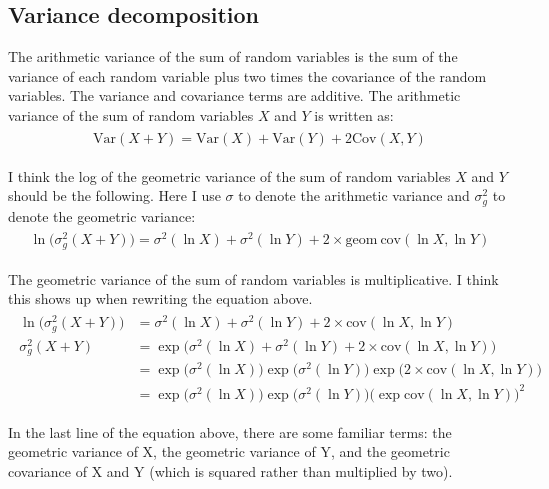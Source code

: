 \documentclass[12pt, oneside, titlepage]{article}   	%
\begin{document}
\subsection*{Variance decomposition}

The arithmetic variance of the sum of random variables is the sum of the variance of each random variable plus two times the covariance of the random variables. The variance and covariance terms are additive. The arithmetic variance of the sum of random variables $X$ and $Y$ is written as:
%
\begin{align}
  \begin{split}
\mathrm{Var}(X + Y) = \mathrm{Var}(X) + \mathrm{Var}(Y) + 2 \mathrm{Cov} (X, Y)
  \end{split}
\end{align}

I think the log of the geometric variance of the sum of random variables $X$ and $Y$ should be the following. Here I use $\sigma$ to denote the arithmetic variance and $\sigma_g^2$ to denote the geometric variance:
%
\begin{align}
  \begin{split}
\ln \big( \sigma_g^2( X + Y) \big) = \sigma^2( \ln X) + \sigma^2(\ln Y) + 2 \times \mathrm{geom\ cov} (\ln X, \ln Y)
  \end{split}
\end{align}

The geometric variance of the sum of random variables is multiplicative. I think this shows up when rewriting the equation above. 
%
\begin{align}
  \begin{split}
\ln \big( \sigma_g^2( X + Y) \big) & = \sigma^2( \ln X) + \sigma^2(\ln Y) + 2 \times \mathrm{ cov} (\ln X, \ln Y) \\
 \sigma_g^2( X + Y) & = \exp \big( \sigma^2( \ln X) + \sigma^2(\ln Y) + 2 \times \mathrm{ cov} (\ln X, \ln Y) \big) \\
 & = \exp \big( \sigma^2( \ln X) \big) \exp \big(  \sigma^2(\ln Y) \big) \exp \big(  2 \times \mathrm{ cov} (\ln X, \ln Y) \big) \\
 & = \exp \big( \sigma^2( \ln X) \big) \exp \big(  \sigma^2(\ln Y) \big)  \big( \exp \mathrm{ cov} (\ln X, \ln Y) \big) ^2
  \end{split}
\end{align}

In the last line of the equation above, there are some familiar terms: the geometric variance of X, the geometric variance of Y, and the geometric covariance of X and Y (which is squared rather than multiplied by two).
\end{document}
